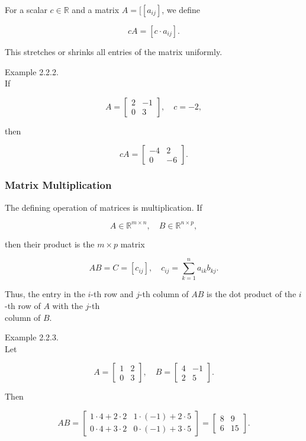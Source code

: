\documentclass[
  12pt,
  a4paper,
]{article}
\begin{document}
For a scalar \(c \in \mathbb{R}\) and a matrix \(A = [[a_{ij}]\), we
define

\[cA = [c \cdot a_{ij}].\]

This stretches or shrinks all entries of the matrix uniformly.

Example 2.2.2.\\
If

\[A = \begin{bmatrix}
2 & -1 \\
0 & 3
\end{bmatrix}, \quad c = -2,\]

then

\[cA = \begin{bmatrix}
-4 & 2 \\
0 & -6
\end{bmatrix}.\]

\subsubsection{Matrix Multiplication}\label{matrix-multiplication}

The defining operation of matrices is multiplication. If

\[A \in \mathbb{R}^{m \times n}, \quad B \in \mathbb{R}^{n \times p},\]

then their product is the \(m \times p\) matrix

\[AB = C = [c_{ij}], \quad c_{ij} = \sum_{k=1}^n a_{ik} b_{kj}.\]

Thus, the entry in the \(i\)-th row and \(j\)-th column of \(AB\) is the
dot product of the \(i\)-th row of \(A\) with the \(j\)-th\\
column of \(B\).

Example 2.2.3.\\
Let

\[A = \begin{bmatrix}
1 & 2 \\
0 & 3
\end{bmatrix}, \quad
B = \begin{bmatrix}
4 & -1 \\
2 & 5
\end{bmatrix}.\]

Then

\[AB = \begin{bmatrix}
1\cdot4 + 2\cdot2 & 1\cdot(-1) + 2\cdot5 \\
0\cdot4 + 3\cdot2 & 0\cdot(-1) + 3\cdot5
\end{bmatrix} =
\begin{bmatrix}
8 & 9 \\
6 & 15
\end{bmatrix}.\]
\end{document}
